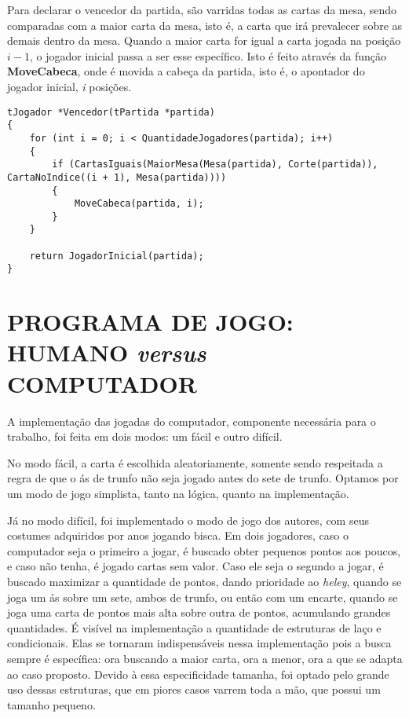 \documentclass[12pt, oneside, a4paper, brazil]{abntex2}
\begin{document}
Para declarar o vencedor da partida, são varridas todas as cartas da mesa, sendo comparadas com a maior carta da mesa, isto é, a carta que irá prevalecer sobre as demais dentro da mesa. Quando a maior carta for igual a carta jogada na posição $i - 1$, o jogador inicial passa a ser esse específico. Isto é feito através da função \textbf{MoveCabeca}, onde é movida a cabeça da partida, isto é, o apontador do jogador inicial, \textit{i} posições.

\begin{lstlisting}
tJogador *Vencedor(tPartida *partida)
{
    for (int i = 0; i < QuantidadeJogadores(partida); i++)
    {
        if (CartasIguais(MaiorMesa(Mesa(partida), Corte(partida)), CartaNoIndice((i + 1), Mesa(partida))))
        {
            MoveCabeca(partida, i);
        }
    }

    return JogadorInicial(partida);
}
\end{lstlisting}


\chapter{PROGRAMA DE JOGO: HUMANO \textit{versus} COMPUTADOR}\label{cap:5}

A implementação das jogadas do computador, componente necessária para o trabalho, foi feita em dois modos: um fácil e outro difícil.

No modo fácil, a carta é escolhida aleatoriamente, somente sendo respeitada a regra de que o ás de trunfo não seja jogado antes do sete de trunfo. Optamos por um modo de jogo simplista, tanto na lógica, quanto na implementação.

Já no modo difícil, foi implementado o modo de jogo dos autores, com seus costumes adquiridos por anos jogando bisca. Em dois jogadores, caso o computador seja o primeiro a jogar, é buscado obter pequenos pontos aos poucos, e caso não tenha, é jogado cartas sem valor. Caso ele seja o segundo a jogar, é buscado maximizar a quantidade de pontos, dando prioridade ao \textit{heley}, quando se joga um ás sobre um sete, ambos de trunfo, ou então com um encarte, quando se joga uma carta de pontos mais alta sobre outra de pontos, acumulando grandes quantidades. É visível na implementação a quantidade de estruturas de laço e condicionais. Elas se tornaram indispensáveis nessa implementação pois a busca sempre é específica: ora buscando a maior carta, ora a menor, ora a que se adapta ao caso proposto. Devido à essa especificidade tamanha, foi optado pelo grande uso dessas estruturas, que em piores casos varrem toda a mão, que possui um tamanho pequeno.
\end{document}
